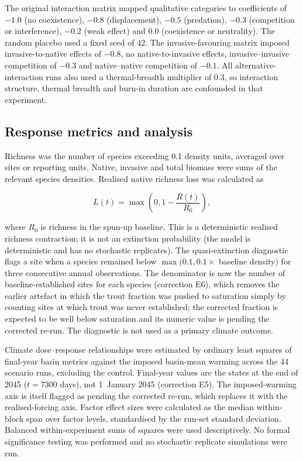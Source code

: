 \documentclass[11pt,a4paper]{article}
\begin{document}
The original interaction matrix mapped qualitative categories to coefficients of $-1.0$ (no coexistence), $-0.8$ (displacement), $-0.5$ (predation), $-0.3$ (competition or interference), $-0.2$ (weak effect) and $0.0$ (coexistence or neutrality). The random placebo used a fixed seed of 42. The invasive-favouring matrix imposed invasive-to-native effects of $-0.8$, no native-to-invasive effects, invasive--invasive competition of $-0.3$ and native--native competition of $-0.1$. All alternative-interaction runs also used a thermal-breadth multiplier of 0.3, so interaction structure, thermal breadth and burn-in duration are confounded in that experiment.

\subsection{Response metrics and analysis}

Richness was the number of species exceeding 0.1 density units, averaged over sites or reporting units. Native, invasive and total biomass were sums of the relevant species densities. Realised native richness loss was calculated as

\begin{equation}
L(t)=\max\left(0,1-\frac{R(t)}{R_0}\right),
\end{equation}

where $R_0$ is richness in the spun-up baseline. This is a deterministic realised richness contraction; it is not an extinction probability (the model is deterministic and has no stochastic replicates). The quasi-extinction diagnostic flags a site when a species remained below $\max(0.1,0.1\times$ baseline density$)$ for three consecutive annual observations. The denominator is now the number of baseline-established sites for each species (correction E6), which removes the earlier artefact in which the trout fraction was pushed to saturation simply by counting sites at which trout was never established; the corrected fraction is expected to be well below saturation and its numeric value is pending the corrected re-run. The diagnostic is not used as a primary climate outcome.

Climate dose--response relationships were estimated by ordinary least squares of final-year basin metrics against the imposed basin-mean warming across the 44 scenario runs, excluding the control. Final-year values are the states at the end of 2045 ($t=7300$ days), not 1~January 2045 (correction E5). The imposed-warming axis is itself flagged as pending the corrected re-run, which replaces it with the realised-forcing axis. Factor effect sizes were calculated as the median within-block span over factor levels, standardised by the run-set standard deviation. Balanced within-experiment sums of squares were used descriptively. No formal significance testing was performed and no stochastic replicate simulations were run.
\end{document}
